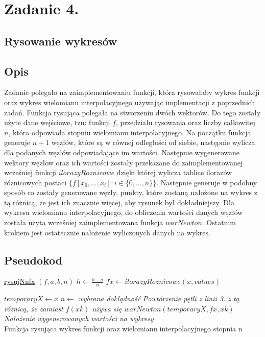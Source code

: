 \documentclass[11pt, a4paper]{article}
\begin{document}
    \section{Zadanie 4.}
    \subsection{Rysowanie wykresów}
    \subsection{Opis}
    Zadanie polegało na zaimplementowaniu funkcji, która rysowałaby wykres funkcji oraz wykres wielomianu interpolacyjnego używając implementacji z poprzednich zadań. Funkcja rysująca polegała na stworzeniu dwóch wektorów. Do tego zostały użyte dane wejściowe, tzn: funkcji $f$, przedziału rysowania oraz liczby całkowitej $n$, która odpowiada stopniu wielomianu interpolacyjnego. Na początku funkcja generuje $n+1$ węzłów, które są w równej odległości od siebie, następnie wylicza dla podanych węzłów odpowiadające im wartości. Następnie wygenerowane wektory węzłow oraz ich wartości zostały przekazane do zaimplementowanej wcześniej funkcji $ilorazyRoznicowe$ dzięki której wylicza tablice ilorazów różnicowych postaci $\{f[x_{0},...,x_{i}]: i \in \{0,...,n\}\}$. Następnie generuje w podobny sposób co zostały generowane węzły, punkty, które zostaną nałożone na wykres z tą różnicą, że jest ich znacznie więcej, aby rysunek był dokładniejszy. Dla wykresu wielomianu interpolacyjnego, do obliczenia wartości danych węzłów została użyta wcześniej zaimplementowana funkcja $warNewton$. Ostatnim krokiem jest ostatecznie nałożenie wyliczonych danych na wykres.
    \subsection{Pseudokod}
    \begin{algorithm}[H]

        \underline{rysujNnfx} $(f, a, b, n)$\;
        $h \gets \frac{b-a}{n}$\;
        $fx \gets ilorazyRoznicowe(x, values)$\;

        $temporaryX \gets x$\;
        $n \gets$ \textit{wybrana dokłądność}\;
        \textit{Powtórzenie pętli z linii 3. z tą różnicą, że zamiast $f(xk)$ używa się $warNewton(temporaryX, fx, xk)$}
        \\
        \textit{Nałożenie wygenerowanych wartości na wykresy}\\
        \caption{Funkcja rysująca wykres funkcji oraz wielomianu interpolacyjnego stopnia n}
    \end{algorithm}
\end{document}
